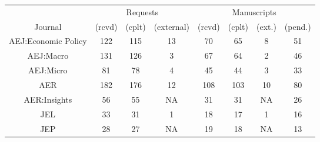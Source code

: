
\begin{tabular}{@{\extracolsep{5pt}} cccccccc} 
\toprule 
        & \multicolumn{3}{c}{Requests} & \multicolumn{4}{c}{Manuscripts}\\
\cmidrule{2-4}\cmidrule{5-8}

Journal & (rcvd) & (cplt) & (external) & (rcvd) & (cplt) & (ext.) & (pend.) \\ 
AEJ:Economic Policy & 122 & 115 & 13 & 70 & 65 & 8 & 51 \\ 
AEJ:Macro & 131 & 126 & 3 & 67 & 64 & 2 & 46 \\ 
AEJ:Micro & 81 & 78 & 4 & 45 & 44 & 3 & 33 \\ 
AER & 182 & 176 & 12 & 108 & 103 & 10 & 80 \\ 
AER:Insights & 56 & 55 & NA & 31 & 31 & NA & 26 \\ 
JEL & 33 & 31 & 1 & 18 & 17 & 1 & 16 \\ 
JEP & 28 & 27 & NA & 19 & 18 & NA & 13 \\ 
\bottomrule 
\end{tabular} 
